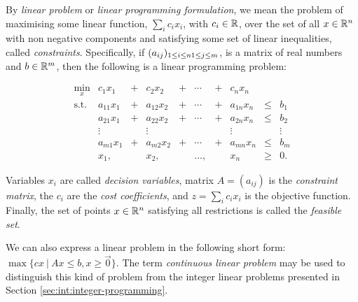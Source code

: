 \begin{definition}
    \label{def:lineaer-programming-problem}
    
    By \emph{linear problem} or \emph{linear programming formulation}, we mean
    the problem of maximising some linear function,
    $
        \sum_i c_i x_i
    $,
    with $c_i \in {\ensuremath{\mathbb{R}}}$, over the set of all $x \in {\ensuremath{\mathbb{R}}}^n$ with non negative
    components and satisfying some set of linear inequalities, called
    \emph{constraints}.  Specifically, if
    $
        (a_{ij})_{1 \leq i \leq n\\1 \leq j \leq m}
    $,
    is a matrix of real numbers and $b \in {\ensuremath{\mathbb{R}}}^m$, then the following is a linear
    programming problem:
    
    \begin{equation*}
        \begin{array}{cccccccccc}
            \min_x
                & c_1 x_1    &+& c_2 x_2    &+& \cdots &+&  c_n x_n   &    & ~       \\
            \text{s.t.}
                & a_{11} x_1 &+& a_{12} x_2 &+& \cdots &+& a_{1n} x_n &\leq& b_1     \\
                & a_{21} x_1 &+& a_{22} x_2 &+& \cdots &+& a_{2n} x_n &\leq& b_2     \\
                & \vdots     & & \vdots     & &        & & \vdots     &      & \vdots\\
                & a_{m1} x_1 &+& a_{m2} x_2 &+& \cdots &+& a_{mn} x_n &\leq& b_m     \\
                &        x_1,& &        x_2,& & \ldots,& &        x_n &\geq& 0.
        \end{array}
    \end{equation*}

    Variables $x_i$ are called \emph{decision variables}, matrix $A = (a_{ij})$
    is the \emph{constraint matrix}, the $c_i$ are the \emph{cost coefficients},
    and $z = \sum_i c_i x_i$ is the objective function. Finally, the set of
    points $x \in {\ensuremath{\mathbb{R}}}^n$ satisfying all restrictions is called the \emph{feasible
    set}.

    We can also express a linear problem in the following short form:
    $
        \max\{
            cx~|~Ax \leq b, x \geq \vec{0}
        \}
    $.
    The term \emph{continuous linear problem} may be used to distinguish this
    kind of problem from the integer linear problems presented in Section
    \ref{sec:int:integer-programming}.
\end{definition}

